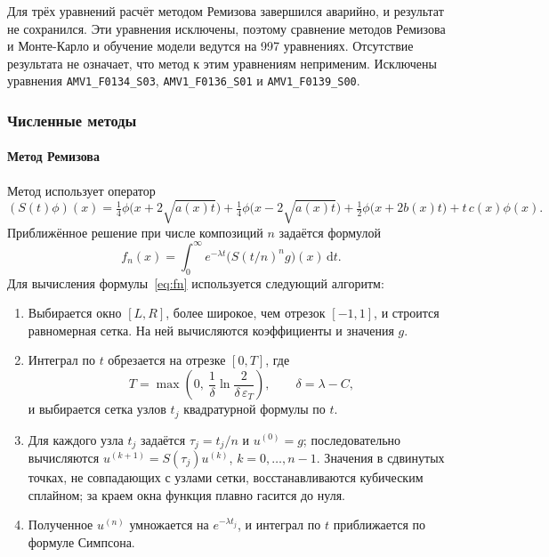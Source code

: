 \documentclass[14pt,a4paper]{extarticle}
\newcommand{\dd}{\mathrm{d}}
\begin{document}
Для трёх уравнений расчёт методом Ремизова завершился аварийно,
и результат не сохранился. Эти уравнения исключены, поэтому сравнение
методов Ремизова и Монте-Карло и обучение модели ведутся
на 997 уравнениях. Отсутствие результата не означает, что метод к этим
уравнениям неприменим. Исключены уравнения
\texttt{AMV1\_F0134\_S03}, \texttt{AMV1\_F0136\_S01}
и \texttt{AMV1\_F0139\_S00}.

\subsubsection{Численные методы}\label{sec:ml-methods}
\paragraph{Метод Ремизова\\}
Метод использует оператор
\[
(S(t)\phi)(x)=\tfrac14\phi\bigl(x+2\sqrt{a(x)t}\bigr)
+\tfrac14\phi\bigl(x-2\sqrt{a(x)t}\bigr)
+\tfrac12\phi\bigl(x+2b(x)t\bigr)+t\,c(x)\phi(x).
\]
Приближённое решение при числе композиций $n$ задаётся формулой
\begin{equation}\label{eq:fn}
f_n(x)=\int_0^\infty e^{-\lambda t}\bigl(S(t/n)^ng\bigr)(x)\,\dd t.
\end{equation}
Для вычисления формулы~\eqref{eq:fn} используется следующий алгоритм:
\begin{enumerate}
\item Выбирается окно $[L,R]$, более широкое, чем отрезок $[-1,1]$,
и строится равномерная сетка. На ней вычисляются коэффициенты
и значения $g$.
\item Интеграл по $t$ обрезается на отрезке $[0,T]$, где
\[
T=\max\left(0,\ \frac1\delta\ln\frac{2}{\delta\,\varepsilon_T}\right),
\qquad \delta=\lambda-C,
\]
и выбирается сетка узлов $t_j$ квадратурной формулы по $t$.
\item Для каждого узла $t_j$ задаётся $\tau_j=t_j/n$ и $u^{(0)}=g$;
последовательно вычисляются $u^{(k+1)}=S(\tau_j)u^{(k)}$,
$k=0,\dots,n-1$. Значения в сдвинутых точках, не совпадающих с узлами
сетки, восстанавливаются кубическим сплайном; за краем окна функция
плавно гасится до нуля.
\item Полученное $u^{(n)}$ умножается на $e^{-\lambda t_j}$, и интеграл
по $t$ приближается по формуле Симпсона.
\end{enumerate}
\end{document}
